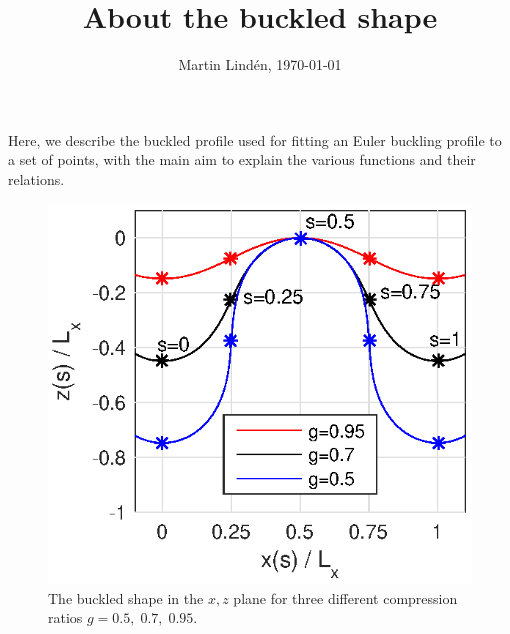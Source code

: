 \documentclass[11pt,a4paper,twocolumn]{article}
\title{About the buckled shape}
\author{Martin Lind\'en,  \today}
\date{}
\begin{document}
\maketitle 
Here, we describe the buckled profile used for fitting an Euler
buckling profile to a set of points, with the main aim to explain the
various functions and their relations.

\begin{figure}
  \includegraphics{figures/buckledshape.eps}
  \caption{\label{fig:buckle} The buckled shape in the $x,z$ plane for
    three different compression ratios $g=0.5,\;0.7,\;0.95$.}
\end{figure}
\end{document}
